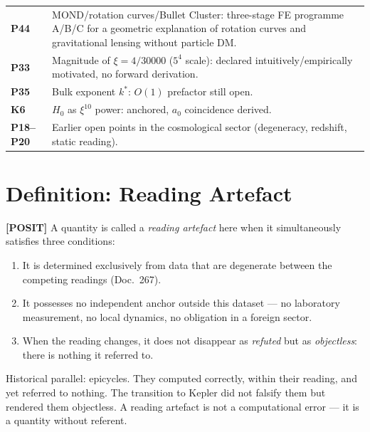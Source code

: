 \medskip
\begin{tabular}{@{}lp{10.5cm}}
\textbf{P44}      & MOND/rotation curves/Bullet Cluster: three-stage
                    FE programme A/B/C for a geometric explanation of
                    rotation curves and gravitational lensing without
                    particle DM. \\[4pt]
\textbf{P33}      & Magnitude of $\xi = 4/30000$ ($5^4$ scale):
                    declared intuitively/empirically motivated, no
                    forward derivation. \\[4pt]
\textbf{P35}      & Bulk exponent $k^*$: $O(1)$ prefactor still open. \\[4pt]
\textbf{K6}       & $H_0$ as $\xi^{10}$ power: anchored,
                    $a_0$ coincidence derived. \\[4pt]
\textbf{P18--P20} & Earlier open points in the cosmological sector
                    (degeneracy, redshift, static reading). \\
\end{tabular}

\chapter{Definition: Reading Artefact}

\textbf{[POSIT]} A quantity is called a \emph{reading artefact} here
when it simultaneously satisfies three conditions:

\begin{enumerate}
  \item It is determined exclusively from data that are degenerate
        between the competing readings (Doc.~267).
  \item It possesses no independent anchor outside this dataset —
        no laboratory measurement, no local dynamics, no obligation
        in a foreign sector.
  \item When the reading changes, it does not disappear as
        \emph{refuted} but as \emph{objectless}: there is nothing
        it referred to.
\end{enumerate}

Historical parallel: epicycles. They computed correctly, within their
reading, and yet referred to nothing. The transition to Kepler did not
falsify them but rendered them objectless. A reading artefact is not
a computational error — it is a quantity without referent.


